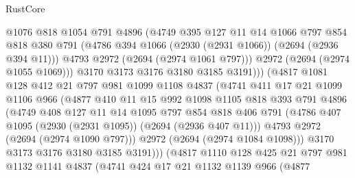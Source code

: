 \begin{lexlean}{RustCore}
\begin{coremodule}
                      @1076
                      @818
                      @1054
                      @791
                      @4896
                      (@4749
                        @395
                        @127
                        @11
                        @14
                        @1066
                        @797
                        @854
                        @818
                        @380
                        @791
                        (@4786 @394 @1066 (@2930 (@2931 @1066)) (@2694 (@2936 @394 @11)))
                        @4793
                        @2972
                        (@2694 (@2974 @1061 @797)))
                      @2972
                      (@2694 (@2974 @1055 @1069)))
                    @3170
                    @3173
                    @3176
                    @3180
                    @3185
                    @3191)))
              (@4817
                @1081
                @128
                @412
                @21
                @797
                @981
                @1099
                @1108
                @4837
                (@4741
                  @411
                  @17
                  @21
                  @1099
                  @1106
                  @966
                  (@4877
                    @410
                    @11
                    @15
                    @992
                    @1098
                    @1105
                    @818
                    @393
                    @791
                    @4896
                    (@4749
                      @408
                      @127
                      @11
                      @14
                      @1095
                      @797
                      @854
                      @818
                      @406
                      @791
                      (@4786 @407 @1095 (@2930 (@2931 @1095)) (@2694 (@2936 @407 @11)))
                      @4793
                      @2972
                      (@2694 (@2974 @1090 @797)))
                    @2972
                    (@2694 (@2974 @1084 @1098)))
                  @3170
                  @3173
                  @3176
                  @3180
                  @3185
                  @3191)))
            (@4817
              @1110
              @128
              @425
              @21
              @797
              @981
              @1132
              @1141
              @4837
              (@4741
                @424
                @17
                @21
                @1132
                @1139
                @966
                (@4877

\end{coremodule}
\end{lexlean}
